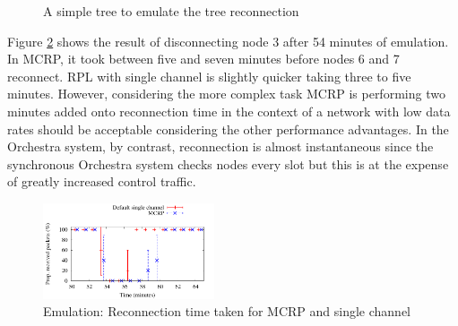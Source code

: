 \begin{figure}
\hfill        
{}
\caption{A simple tree to emulate the tree reconnection}
\label{fig:reconnectionLayout}
\end{figure}

Figure \ref{fig:reconnection} shows the result of disconnecting node 3 after 54 minutes of emulation.  In MCRP, it took between five and seven minutes before nodes 6 and 7 reconnect.  RPL with single channel is slightly quicker taking three to five minutes. However, considering the more complex task MCRP is performing two minutes added onto reconnection time in the context of a network with low data rates should be acceptable considering the other performance advantages.  In the Orchestra system, by contrast, reconnection is almost instantaneous since the synchronous Orchestra system checks nodes every slot but this is at the expense of greatly increased control traffic.

\begin{figure}
\centering
\includegraphics[width=0.45\textwidth]{figures/reconnect.pdf}
\caption{Emulation: Reconnection time taken for MCRP and single channel}
\label{fig:reconnection}
\end{figure}
